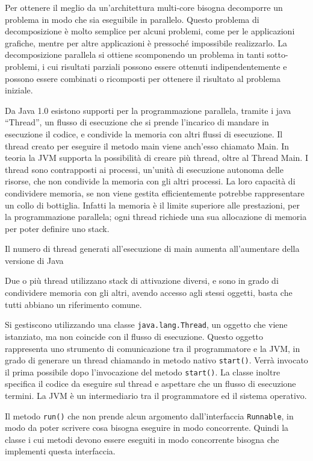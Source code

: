 \documentclass{article}
\numberwithin{equation}{subsection}
\begin{document}
Per ottenere il meglio da un'architettura multi-core bisogna decomporre un problema in modo che sia eseguibile in parallelo. Questo problema di decomposizione è molto semplice 
per alcuni problemi, come per le applicazioni grafiche, mentre per altre applicazioni è pressoché impossibile realizzarlo. 
La decomposizione parallela si ottiene scomponendo un problema in tanti sotto-problemi, i cui risultati parziali possono essere ottenuti indipendentemente e possono essere 
combinati o ricomposti per ottenere il risultato al problema iniziale. 


Da Java 1.0 esistono supporti per la programmazione parallela, tramite i java ``Thread'', un flusso di esecuzione che si prende l'incarico di mandare in esecuzione il 
codice, e condivide la memoria con altri flussi di esecuzione. Il thread creato per eseguire il metodo main viene anch'esso chiamato Main. In teoria la JVM supporta la 
possibilità di creare più thread, oltre al Thread Main. I thread sono contrapposti ai processi, un'unità di esecuzione 
autonoma delle risorse, che non condivide la memoria con gli altri processi. La loro capacità di condividere memoria, se non viene gestita efficientemente potrebbe 
rappresentare un collo di bottiglia. Infatti la memoria è il limite superiore alle prestazioni, per la programmazione parallela; ogni thread richiede una sua 
allocazione di memoria per poter definire uno stack. 

Il numero di thread generati all'esecuzione di main aumenta all'aumentare della versione di Java %

Due o più thread utilizzano stack di attivazione diversi, e sono in grado di condividere memoria con gli altri, avendo accesso agli stessi oggetti, basta che tutti abbiano 
un riferimento comune. 


Si gestiscono utilizzando una classe \verb|java.lang.Thread|, un oggetto che viene istanziato, ma non coincide con il flusso di esecuzione. Questo oggetto rappresenta uno 
strumento di comunicazione tra il programmatore e la JVM, in grado di generare un thread chiamando in metodo nativo \verb|start()|. Verrà invocato il prima possibile dopo 
l'invocazione del metodo \verb|start()|. La classe inoltre specifica il codice da eseguire sul thread e aspettare che un flusso di esecuzione termini. 
La JVM è un intermediario tra il programmatore ed il sistema operativo. 

Il metodo \verb|run()| che non prende alcun argomento dall'interfaccia \verb|Runnable|, in modo da poter scrivere cosa bisogna eseguire in modo concorrente. Quindi la classe 
i cui metodi devono essere eseguiti in modo concorrente bisogna che implementi questa interfaccia. 
\end{document}

